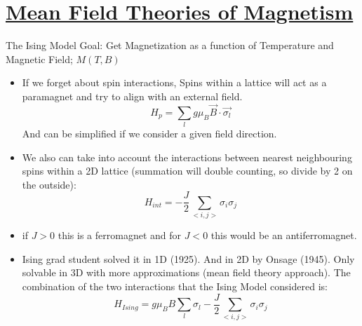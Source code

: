 \section[Mean Field Theories of Magnetism]{\hyperlink{toc}{Mean Field Theories of Magnetism}}

The Ising Model
Goal: Get Magnetization as a function of Temperature and Magnetic Field; $M(T,B)$
\begin{itemize}
    \item If we forget about spin interactions, Spins within a lattice will act as a paramagnet and try to align with an external field.
    \[H_{p} = \sum_l  g \mu_B \vec{B} \cdot \vec{\sigma_l}\]
    And can be simplified if we consider a given field direction.
    \item We also can take into account the interactions between nearest neighbouring spins within a 2D lattice (summation will double counting, so divide by 2 on the outside):
    \[H_{int} = -\frac{J}{2}\sum_{<i,j>} \sigma_i \sigma_j \]
    \item if $J>0$ this is a ferromagnet and for $J<0$ this would be an antiferromagnet.
    \item Ising grad student solved it in 1D (1925). And in 2D by Onsage (1945). Only solvable in 3D with more approximations (mean field theory approach). The combination of the two interactions that the Ising Model considered is:
    \[H_{Ising} = g \mu_B B \sum_l \sigma_l - \frac{J}{2} \sum_{<i,j>} \sigma_i\sigma_j\]
\end{itemize}

